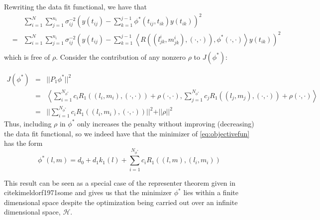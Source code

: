 \documentclass[12pt]{article}
\theoremstyle{definition}
\begin{document}
Rewriting the data fit functional, we have that  
 \begin{eqnarray*}
&\mbox{ }&\sum_{i=1}^N \sum_{j=1}^{n_i} \sigma_{ij}^{-2} \left(y\left(t_{ij}\right) - \sum_{k=1}^{j-1} \phi^*\left(t_{ij}, t_{ik}  \right) y\left(t_{ik}\right)  \right)^2  \\ 
&=& \sum_{i=1}^N \sum_{j=1}^{n_i} \sigma_{ij}^{-2} \left(y\left(t_{ij}\right) - \sum_{k=1}^{j-1} \left< R\left(\left(l^i_{jk},m^i_{jk}\right),\left(\cdot,\cdot\right) \right),\phi^*\left(\cdot,\cdot\right)\right> y\left(t_{ik}\right)  \right)^2  \\
 \end{eqnarray*}
\noindent
which is free of $\rho$. Consider the contribution of any nonzero $\rho$ to $J\left(\phi^*\right)$: 
  
 \begin{eqnarray*}
 J\left(\phi^*\right) &=& \vert \vert  P_1\phi^* \vert \vert^2\\
 &=& \left< \sum_{i=1}^{N_{\phi^*}}  c_i R_1\left( \left(l_i,m_i\right),\left(\cdot,\cdot\right) \right) + \rho\left(\cdot,\cdot \right), \sum_{j=1}^{N_{\phi^*}} c_j R_1\left( \left(l_j,m_j\right),\left(\cdot,\cdot\right) \right) + \rho\left(\cdot,\cdot\right)\right> \\
 &=& \vert \vert \sum_{i=1}^{N_{\phi^*}}  c_i R_1\left(\left(l_i,m_i\right),\left(\cdot,\cdot\right) \right) \vert \vert^2 + \vert \vert  \rho \vert \vert^2 
 \end{eqnarray*}
\noindent
Thus, including $\rho$ in $\phi^*$ only increases the penalty without improving (decreasing) the data fit functional, so we indeed have that the minimizer of \eqref{eq:objectivefun} has the form
\begin{equation}
 \phi^*\left(l,m\right) =  d_0 + d_1k_1\left(l\right) + \sum_{i=1}^{N_{\phi^*}} c_i R_1\left( \left(l,m\right) , \left(l_i,m_i \right)\right)
 \label{eq:finitedimsolution}
 \end{equation}

This result can be seen as a special case of the representer theorem given in cite{kimeldorf1971some} and gives us that the minimizer $\phi^*$ lies within a finite dimensional space despite the optimization being carried out over an infinite dimensional space, $\mathcal{H}$. 
\end{document}
